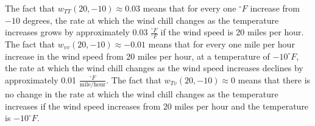 \begin{activitySolution}
\item The fact that $w_{TT}(20, -10) \approx 0.03$ means that for every one $^{\circ}F$ increase from $-10$ degrees, the rate at which the wind chill changes as the temperature increases grows by approximately 0.03 $\frac{^{\circ}F}{^{\circ}F}$ if the wind speed is 20 miles per hour.  The fact that $w_{vv}(20, -10) \approx -0.01$ means that for every one mile per hour increase in the wind speed from 20 miles per hour, at a temperature of $-10^{\circ}F$, the rate at which the wind chill changes as the wind speed increases declines by approximately 0.01 $\frac{^{\circ}F}{\text{mile/hour}}$. The fact that $w_{Tv}(20, -10) \approx 0$ means that there is no change in the rate at which the wind chill changes as the temperature increases if the wind speed increases from 20 miles per hour and the temperature is $-10^{\circ}F$. 
\ea
\end{activitySolution}


\aftera
